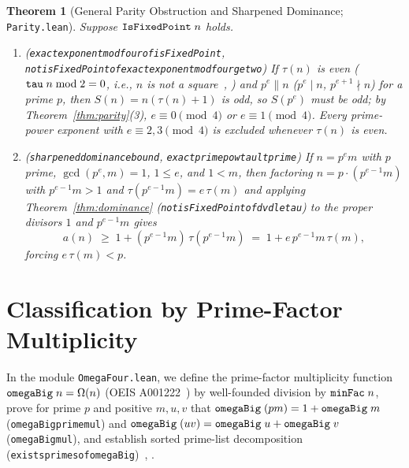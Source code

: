 \documentclass[11pt,reqno]{amsart}
\theoremstyle{plain}
\newtheorem{theorem}{Theorem}[section]
\theoremstyle{definition}
\theoremstyle{remark}
\newcommand{\leanid}[1]{\texttt{\upshape\def\_{\char95\relax}#1}}
\begin{document}
\begin{theorem}[General Parity Obstruction and Sharpened Dominance; \leanid{Parity.lean}]
\label{thm:obstruction}
Suppose $\leanid{IsFixedPoint}\;n$ holds.
\begin{enumerate}
  \item (\leanid{exact\_\allowbreak exponent\_\allowbreak mod\_\allowbreak four\_\allowbreak of\_\allowbreak isFixedPoint},\\ \leanid{not\_\allowbreak isFixedPoint\_\allowbreak of\_\allowbreak exact\_\allowbreak exponent\_\allowbreak mod\_\allowbreak four\_\allowbreak ge\_\allowbreak two}) If $\tau(n)$ is even ($\leanid{tau}\;n \bmod 2 = 0$, i.e., $n$ is not a square~\cite[Ch.~6]{Burton1976}, \cite[Ch.~3]{Tattersall1999}) and $p^e \parallel n$ ($p^e \mid n$, $p^{e+1} \nmid n$) for a prime $p$, then $S(n) = n(\tau(n) + 1)$ is odd, so $S(p^e)$ must be odd; by Theorem~\ref{thm:parity}(3), $e \equiv 0 \pmod 4$ or $e \equiv 1 \pmod 4$. Every prime-power exponent with $e \equiv 2, 3 \pmod 4$ is excluded whenever $\tau(n)$ is even.
  \item (\leanid{sharpened\_\allowbreak dominance\_\allowbreak bound}, \leanid{exact\_\allowbreak prime\_\allowbreak pow\_\allowbreak tau\_\allowbreak lt\_\allowbreak prime}) If $n = p^e m$ with $p$ prime, $\gcd(p^e, m) = 1$, $1 \le e$, and $1 < m$, then factoring $n = p \cdot (p^{e-1} m)$ with $p^{e-1} m > 1$ and $\tau(p^{e-1} m) = e\,\tau(m)$ and applying Theorem~\ref{thm:dominance} (\leanid{not\_\allowbreak isFixedPoint\_\allowbreak of\_\allowbreak dvd\_\allowbreak le\_\allowbreak tau}) to the proper divisors $1$ and $p^{e-1} m$ gives
  \[
    a(n) \;\ge\; 1 + (p^{e-1} m)\,\tau(p^{e-1} m) \;=\; 1 + e\,p^{e-1} m\,\tau(m),
  \]
  forcing $e\,\tau(m) < p$.
\end{enumerate}
\end{theorem}

\section{Classification by Prime-Factor Multiplicity}

In the module \leanid{OmegaFour.lean}, we define the prime-factor multiplicity function $\leanid{omegaBig}\;n = \Omega(n)$ (OEIS A001222~\cite{OEIS-A001222}) by well-founded division by $\leanid{minFac}\;n$, prove for prime $p$ and positive $m,u,v$ that $\leanid{omegaBig}\;(p m) = 1 + \leanid{omegaBig}\;m$ (\leanid{omegaBig\_\allowbreak prime\_\allowbreak mul}) and $\leanid{omegaBig}\;(u v) = \leanid{omegaBig}\;u + \leanid{omegaBig}\;v$ (\leanid{omegaBig\_\allowbreak mul}), and establish sorted prime-list decomposition (\leanid{exists\_\allowbreak primes\_\allowbreak of\_\allowbreak omegaBig})~\cite[Ch.~1]{Apostol1976}, \cite[Ch.~3]{Burton1976}.
\end{document}
